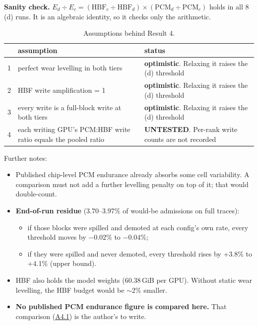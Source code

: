 \documentclass[11pt,a4paper]{article}
\newcommand{\hd}[1]{\textbf{#1}}
\begin{document}
\textbf{Sanity check.}
$E_d \div E_c = (\mathrm{HBF}_c \div \mathrm{HBF}_d) \times (\mathrm{PCM}_d \div \mathrm{PCM}_c)$
holds in all 8 (d) runs. It is an algebraic identity, so it checks only the
arithmetic.

\begin{xltabular}{\linewidth}{@{}c Y{1.0} Y{1.0}@{}}
\caption{Assumptions behind Result 4.}\label{tab:r4assume}\\
\toprule
 & \hd{assumption} & \hd{status} \\
 & perfect wear levelling in both tiers & \textbf{optimistic}. Relaxing it raises the (d) threshold \\
2 & HBF write amplification = 1 & \textbf{optimistic}. Relaxing it raises the (d) threshold \\
3 & every write is a full-block write at both tiers & \textbf{optimistic}. Relaxing it raises the (d) threshold \\
4 & each writing GPU's PCM:HBF write ratio equals the pooled ratio & \textbf{UNTESTED}. Per-rank write counts are not recorded \\
\bottomrule
\end{xltabular}

Further notes:
\begin{itemize}
  \item Published chip-level PCM endurance already absorbs some cell
    variability. A comparison must not add a further levelling penalty on top
    of it; that would double-count.
  \item \textbf{End-of-run residue} (3.70--3.97\% of would-be admissions on
    full traces):
  \begin{itemize}
    \item if those blocks were spilled and demoted at each config's own rate,
      every threshold moves by $-0.02$\% to $-0.04$\%;
    \item if they were spilled and never demoted, every threshold rises by
      +3.8\% to +4.1\% (upper bound).
  \end{itemize}
  \item HBF also holds the model weights (60.38\,GiB per GPU). Without static
    wear levelling, the HBF budget would be $\sim$2\% smaller.
  \item \textbf{No published PCM endurance figure is compared here.} That
    comparison (\hyperref[sec:lit]{A4.1}) is the author's to write.
\end{itemize}
\end{document}
